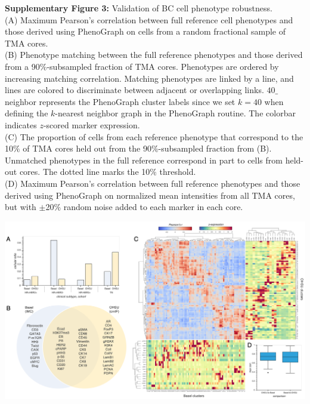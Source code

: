 \documentclass[preprint,review,3p,12pt]{elsarticle}
\begin{document}
\newpage

\noindent
\textbf{Supplementary Figure 3:} Validation of BC cell phenotype robustness.\\
(A) Maximum Pearson's correlation between full reference cell phenotypes and those derived using PhenoGraph on cells from a random fractional sample of TMA cores.\\
(B) Phenotype matching between the full reference phenotypes and those derived from a 90$\%$-subsampled fraction of TMA cores. Phenotypes are ordered by increasing matching correlation. Matching phenotypes are linked by a line, and lines are colored to discriminate between adjacent or overlapping links. $40\_$neighbor represents the PhenoGraph cluster labels since we set $k=40$ when defining the $k$-nearest neighbor graph in the PhenoGraph routine. The colorbar indicates $z$-scored marker expression.\\
(C) The proportion of cells from each reference phenotype that correspond to the 10$\%$ of TMA cores held out from the 90$\%$-subsampled fraction from (B). Unmatched phenotypes in the full reference correspond in part to cells from held-out cores. The dotted line marks the 10$\%$ threshold.\\
(D) Maximum Pearson's correlation between full reference phenotypes and those derived using PhenoGraph on normalized mean intensities from all TMA cores, but with $\pm$20$\%$ random noise added to each marker in each core.

\newpage

\begin{suppfigure}[h]
\centering\includegraphics[width=\linewidth,
                 keepaspectratio]{suppfig4}
\caption{}
\label{fig:suppfig4}
\end{suppfigure}
\end{document}
